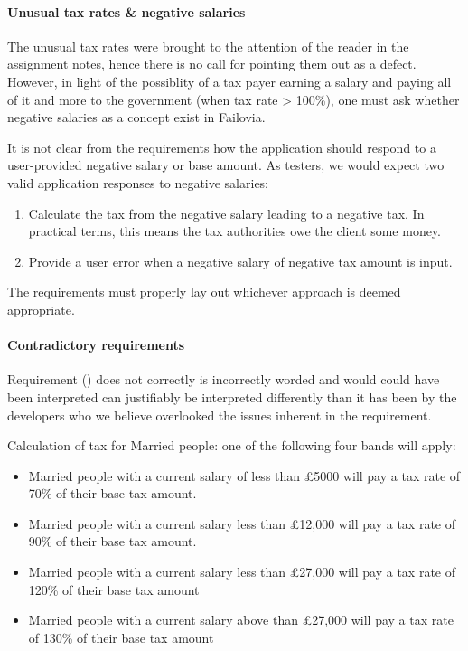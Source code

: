 \paragraph{Unusual tax rates \& negative salaries}
The unusual tax rates were brought to the attention of the reader in the assignment notes, hence there is no call for pointing them out as a defect. However, in light of the possiblity of a tax payer earning a salary and paying all of it and more to the government (when tax rate > 100\%), one must ask whether negative salaries as a concept exist in Failovia. 
\par
It is not clear from the requirements how the application should respond to a user-provided negative salary or base amount. As testers, we would expect two valid application responses to negative salaries: 

\begin{enumerate}
	\item Calculate the tax from the negative salary leading to a negative tax. In practical terms, this means the tax authorities owe the client some money.
	\item Provide a user error when a negative salary of negative tax amount is input. 
\end{enumerate}

The requirements must properly lay out whichever approach is deemed appropriate.

\paragraph{Contradictory requirements}
Requirement (\REightFive) does not correctly  is incorrectly worded and would could have been interpreted  can justifiably be interpreted differently than it has been by the developers who we believe overlooked the issues inherent in the requirement. 
\par
Calculation of tax for Married people: one of the following four bands will apply:
\begin{itemize}
	\item Married people with a current salary of less than £5000 will pay a tax rate of
	70\% of their base tax amount.
	\item Married people with a current salary less than £12,000 will pay a tax rate of
	90\% of their base tax amount.
	\item Married people with a current salary less than £27,000 will pay a tax rate of
	120\% of their base tax amount
	\item Married people with a current salary above than £27,000 will pay a tax rate
	of 130\% of their base tax amount
\end{itemize}	

